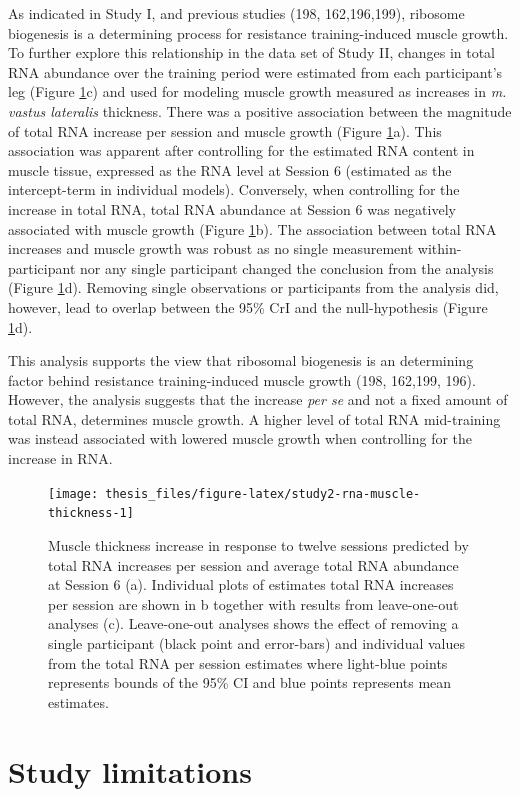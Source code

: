 \documentclass[twoside,10pt]{gihclass} %
\begin{document}
As indicated in Study I, and previous studies
(198, 162,196,199),
ribosome biogenesis is a determining process for resistance training-induced muscle growth.
To further explore this relationship in the data set of Study II, changes in total RNA abundance over the training period were estimated from each participant's leg (Figure \ref{fig:study2-rna-muscle-thickness}c) and used for modeling muscle growth measured as increases in \emph{m. vastus lateralis} thickness.
There was a positive association between the magnitude of total RNA increase per session and muscle growth (Figure \ref{fig:study2-rna-muscle-thickness}a).
This association was apparent after controlling for the estimated RNA content in muscle tissue, expressed as the RNA level at Session 6 (estimated as the intercept-term in individual models). Conversely, when controlling for the increase in total RNA, total RNA abundance at Session 6 was negatively associated with muscle growth (Figure \ref{fig:study2-rna-muscle-thickness}b).
The association between total RNA increases and muscle growth was robust as no single measurement within-participant nor any single participant changed the conclusion from the analysis (Figure \ref{fig:study2-rna-muscle-thickness}d). Removing single observations or participants from the analysis did, however, lead to overlap between the 95\% CrI and the null-hypothesis (Figure \ref{fig:study2-rna-muscle-thickness}d).

This analysis supports the view that ribosomal biogenesis is an determining factor behind resistance training-induced muscle growth
(198, 162,199,
196).
However, the analysis suggests that the increase \emph{per se} and not a fixed amount of total RNA, determines muscle growth.
A higher level of total RNA mid-training was instead associated with lowered muscle growth when controlling for the increase in RNA.
\begin{figure}

{\centering \texttt{[image: thesis\_files/figure-latex/study2-rna-muscle-thickness-1]} 

}

\caption[Relationship between total RNA and muscle hypertrophy in Study II]{Muscle thickness increase in response to twelve sessions predicted by total RNA increases per session and average total RNA abundance at Session 6 (a). Individual plots of estimates total RNA increases per session are shown in b together with results from leave-one-out analyses (c). Leave-one-out analyses shows the effect of removing a single participant (black point and error-bars) and individual values from the total RNA per session estimates where light-blue points represents bounds of the 95\% CI and blue points represents mean estimates.}\label{fig:study2-rna-muscle-thickness}
\end{figure}
\hypertarget{study-limitations}{%
\section{Study limitations}\label{study-limitations}}
\end{document}

